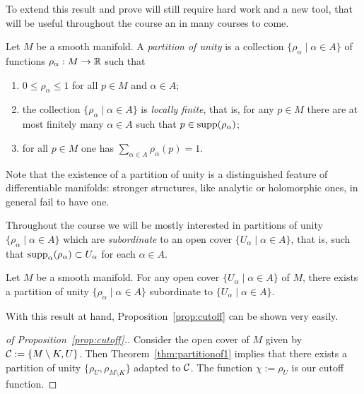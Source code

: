 To extend this result and prove will still require hard work and a new tool, that will be useful throughout the course an in many courses to come.

\begin{defn}
  Let $M$ be a smooth manifold. A \emph{partition of unity} is a collection $\{\rho_\alpha \mid \alpha\in A\}$ of functions $\rho_\alpha:M\to\mathbb{R}$ such that
  \begin{enumerate}
    \item $0 \leq \rho_\alpha \leq 1$ for all $p\in M$ and $\alpha\in A$;
    \item\label{def:pou.2} the collection $\{\rho_\alpha \mid \alpha\in A\}$ is \emph{locally finite}, that is, for any $p\in M$ there are at most finitely many $\alpha\in A$ such that $p\in\operatorname{supp}(\rho_\alpha)$;
    \item for all $p\in M$ one has $\sum_{\alpha\in A} \rho_\alpha(p) = 1$.
  \end{enumerate}
\end{defn}

Note that the existence of a partition of unity is a distinguished feature of differentiable manifolds: stronger structures, like analytic or holomorphic ones, in general fail to have one.

Throughout the course we will be mostly interested in partitions of unity $\{\rho_\alpha \mid \alpha\in A\}$ which are \emph{subordinate} to an open cover $\{U_\alpha\mid\alpha\in A\}$, that is, such that $\operatorname{supp}_\alpha(\rho_\alpha) \subset U_\alpha$ for each $\alpha\in A$.

\begin{thm}\label{thm:partitionof1}
  Let $M$ be a smooth manifold. For any open cover $\{U_\alpha\mid\alpha\in A\}$ of $M$, there exists a partition of unity $\{\rho_\alpha \mid \alpha\in A\}$ subordinate to $\{U_\alpha\mid\alpha\in A\}$.
\end{thm}

With this result at hand, Proposition~\ref{prop:cutoff} can be shown very easily.

\begin{proof}[of Proposition~\ref{prop:cutoff}.]
  Consider the open cover of $M$ given by $\mathcal{C}:=\{M\setminus K, U\}$.
  Then Theorem~\ref{thm:partitionof1} implies that there exists a partition of unity $\{\rho_U, \rho_{M\setminus K}\}$ adapted to $\mathcal{C}$. The function $\chi := \rho_U$ is our cutoff function.
\end{proof}

